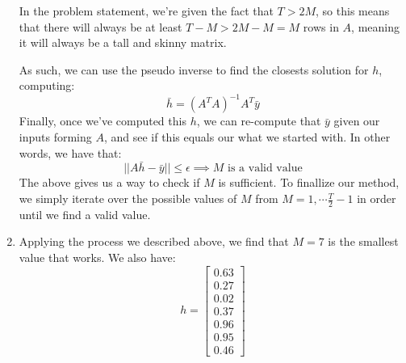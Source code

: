 \documentclass[12pt]{exam}
\begin{document}
\begin{questions}
\begin{solution}
\begin{enumerate}[label=(\alph*)]
      In the problem statement, we're given the fact that $T > 2M$, so this means that there will always be at least $T-M > 2M -M = M$ rows in $A$, meaning it will always be a tall and skinny matrix. 

      As such, we can use the pseudo inverse to find the closests solution for $h$, computing:
      \[
        \bar{h} = (A^TA)^{-1}A^T\bar{y}
      \]
      Finally, once we've computed this $h$, we can re-compute that $\bar{y}$ given our inputs forming $A$, and see if this equals our what we started with. In other words, we have that:
      \[
        ||A\bar{h} - \bar{y}|| \leq \epsilon \implies M \text{ is a valid value} \tag{$\epsilon$ is needed to deal with floating point imprecision}
      \]
      The above gives us a way to check if $M$ is sufficient. To finallize our method, we simply iterate over the possible values of $M$ from $M = 1, \cdots \frac{T}{2} - 1$ in order until we find a valid value.

      \item Applying the process we described above, we find that $M = 7$ is the smallest value that works. We also have:
      \[
        h =
          \begin{bmatrix}
            0.63 \\
            0.27 \\
            0.02 \\
            0.37 \\
            0.96 \\
            0.95 \\
            0.46
          \end{bmatrix}
      \]
    \end{enumerate}
  \end{solution}
\end{questions}
\end{document}
